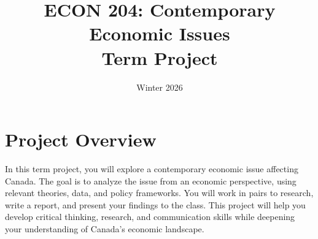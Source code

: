 \documentclass[12pt]{article}
\title{ECON 204: Contemporary Economic Issues \\ Term Project}
\date{Winter 2026}
\begin{document}
\maketitle

\section*{Project Overview}
In this term project, you will explore a contemporary economic issue affecting Canada. The goal is to analyze the issue from an economic perspective, using relevant theories, data, and policy frameworks. You will work in pairs to research, write a report, and present your findings to the class. This project will help you develop critical thinking, research, and communication skills while deepening your understanding of Canada's economic landscape.
\end{document}
